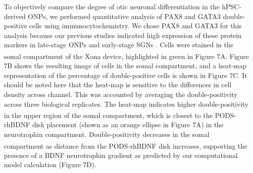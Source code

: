 \documentclass[review]{elsarticle}
\begin{document}
To objectively compare the degree of otic neuronal differentiation in the hPSC-derived ONPs, we performed quantitative analysis of PAX8 and GATA3 double-positive cells using immunocytochemistry. We chose PAX8 and GATA3 for this analysis because our previous studies indicated high expression of these protein markers in late-stage ONPs and early-stage SGNs \cite{Heuer2021,Chang2020, Matsuoka2017}. Cells were stained in the somal compartment of the Xona\textsuperscript{\texttrademark} device, highlighted in green in Figure 7A. Figure 7B shows the resulting image of cells in the somal compartment, and a heat-map representation of the percentage of double-positive cells is shown in Figure 7C.
It should be noted here that the heat-map is sensitive to the differences in cell density across channel. This was accounted by averaging the double-positivity across three biological replicates. The heat-map indicates higher double-positivity in the upper region of the somal compartment, which is closest to the PODS\textsuperscript{\textregistered}-rhBDNF disk placement (shown as an orange ellipse in Figure 7A) in the neurotrophin compartment. Double-positivity decreases in the somal compartment as distance from the PODS\textsuperscript{\textregistered}-rhBDNF disk increases, supporting the presence of a BDNF neurotrophin gradient as predicted by our computational model calculation (Figure 7D).
\end{document}
